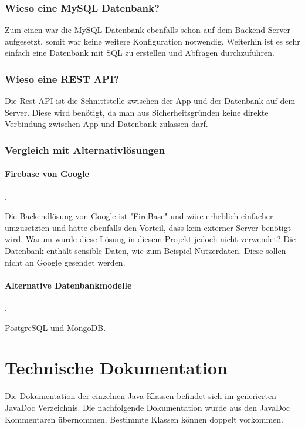 \documentclass{scrartcl}
\begin{document}
\subsubsection{Wieso eine MySQL Datenbank?}

Zum einen war die MySQL Datenbank ebenfalls schon auf dem Backend Server aufgesetzt, somit war keine weitere Konfiguration notwendig. Weiterhin ist es sehr einfach eine Datenbank mit SQL zu erstellen und Abfragen durchzuführen.

\subsubsection{Wieso eine REST API?}

Die Rest API ist die Schnittstelle zwischen der App und der Datenbank auf dem Server. Diese wird benötigt, da man aus Sicherheitsgründen keine direkte Verbindung zwischen App und Datenbank zulassen darf.

\subsubsection{Vergleich mit Alternativlösungen}

\paragraph{Firebase von Google}.\newline

\noindent Die Backendlösung von Google ist "FireBase" und wäre erheblich einfacher umzusetzten und hätte ebenfalls den Vorteil, dass kein externer Server benötigt wird. Warum wurde diese Lösung in diesem Projekt jedoch nicht verwendet? Die Datenbank enthält sensible Daten, wie zum Beispiel Nutzerdaten. Diese sollen nicht an Google gesendet werden.

\paragraph{Alternative Datenbankmodelle}.\newline

\noindent PostgreSQL und MongoDB.

\newpage

\section{Technische Dokumentation}

Die Dokumentation der einzelnen Java Klassen befindet sich im generierten JavaDoc Verzeichnis. Die nachfolgende Dokumentation wurde aus den JavaDoc Kommentaren übernommen. Bestimmte Klassen können doppelt vorkommen.
\end{document}
